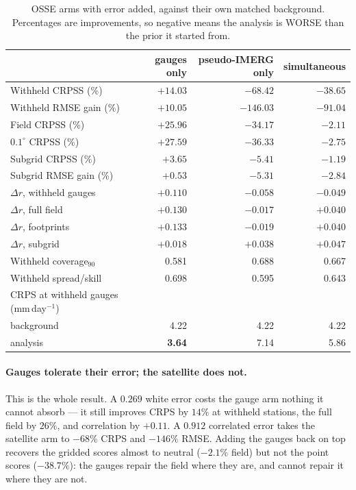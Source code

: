 \begin{table}[t]
\centering
\caption{OSSE arms with error added, against their own matched background.
Percentages are improvements, so negative means the analysis is WORSE than the
prior it started from.}
\label{tab:pseudo-satellite}
\small
\begin{tabular}{lrrr}
\hline
 & gauges only & pseudo-IMERG only & simultaneous \\
\hline
Withheld CRPSS (\%)        & $+14.03$ & $-68.42$  & $-38.65$ \\
Withheld RMSE gain (\%)    & $+10.05$ & $-146.03$ & $-91.04$ \\
Field CRPSS (\%)           & $+25.96$ & $-34.17$  & $-2.11$  \\
$0.1^\circ$ CRPSS (\%)     & $+27.59$ & $-36.33$  & $-2.75$  \\
Subgrid CRPSS (\%)         & $+3.65$  & $-5.41$   & $-1.19$  \\
Subgrid RMSE gain (\%)     & $+0.53$  & $-5.31$   & $-2.84$  \\
\hline
$\Delta r$, withheld gauges & $+0.110$ & $-0.058$ & $-0.049$ \\
$\Delta r$, full field      & $+0.130$ & $-0.017$ & $+0.040$ \\
$\Delta r$, footprints      & $+0.133$ & $-0.019$ & $+0.040$ \\
$\Delta r$, subgrid         & $+0.018$ & $+0.038$ & $+0.047$ \\
\hline
Withheld coverage$_{90}$    & 0.581 & 0.688 & 0.667 \\
Withheld spread/skill       & 0.698 & 0.595 & 0.643 \\
\hline
CRPS at withheld gauges (mm\,day$^{-1}$) & & & \\
\quad background            & 4.22 & 4.22 & 4.22 \\
\quad analysis              & \textbf{3.64} & 7.14 & 5.86 \\
\hline
\end{tabular}
\end{table}

\paragraph{Gauges tolerate their error; the satellite does not.}
This is the whole result. A $0.269$ white error costs the gauge arm nothing it
cannot absorb --- it still improves CRPS by $14\%$ at withheld stations, the
full field by $26\%$, and correlation by $+0.11$. A $0.912$ correlated error
takes the satellite arm to $-68\%$ CRPS and $-146\%$ RMSE. Adding the gauges
back on top recovers the gridded scores almost to neutral ($-2.1\%$ field) but
not the point scores ($-38.7\%$): the gauges repair the field where they are,
and cannot repair it where they are not.

